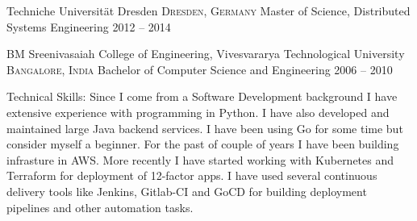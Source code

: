 \documentclass[10pt,a4paper]{article}
\begin{document}

\headedsection
  {Techniche Universit{\"a}t Dresden}
  {\textsc{Dresden, Germany}} {%
  \headedsubsection
    {Master of Science, Distributed Systems Engineering}
    {2012 -- 2014}
    {
    }
}

\headedsection
  {BM Sreenivasaiah College of Engineering, Vivesvararya Technological University}
  {\textsc{Bangalore, India}} {%
  \headedsubsection
    {Bachelor of Computer Science and Engineering}
    {2006 -- 2010}
    {
    }
}

\spacedhrule{1.6em}{-0.4em}


\inlineheadsection  %
  {Technical Skills:}
    {Since I come from a Software Development background I have extensive experience with programming in Python. I have also developed and maintained large Java backend services. I have been using Go for some time but consider myself a beginner. For the past of couple of years I have been building infrasture in AWS. More recently I have started working with Kubernetes and Terraform for deployment of 12-factor apps. I have used several continuous delivery tools like Jenkins, Gitlab-CI and GoCD for building deployment pipelines and other automation tasks.}
\end{document}
